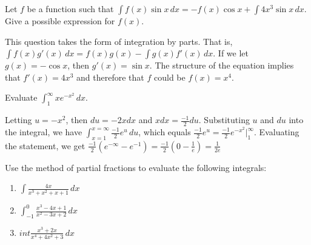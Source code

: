 \begin{Exercise}[label=int_meth3]
Let $f$ be a function such that $\int f(x) \sin{x}\,dx = -f(x)\cos{x} 
+ \int 4x^3 \sin{x}\,dx$. Give a possible expression for $f(x)$. 
\end{Exercise}

\begin{Answer}[ref=int_meth3]
This question takes the form of integration by parts. That is, $\int 
f(x)g'(x)\,dx = f(x)g(x) - \int g(x)f'(x)\,dx$. If we let $g(x) = 
-\cos{x}$, then $g'(x) =\sin{x}$. The structure of the equation 
implies that $f'(x) = 4x^3$ and therefore that $f$ could be $f(x) = 
x^4$. 
\end{Answer}

\begin{Exercise}[label=int_meth4]
Evaluate $\int_1^{\infty}xe^{-x^2}\,dx$. 
\end{Exercise}

\begin{Answer}[ref=int_meth4]
Letting $u = -x^2$, then $du = -2x dx$ and $x dx = \frac{-1}{2}du$. 
Substituting $u$ and $du$ into the integral, we have $\int_{x = 1}^{x 
= \infty} \frac{-1}{2}e^u\,du$, which equals $\frac{-1}{2}e^u = 
\frac{-1}{2}e^{-x^2}|_1^{\infty}$. Evaluating the statement, we get 
$\frac{-1}{2}(e^{-\infty} - e^{-1}) = \frac{-1}{2}(0-\frac{1}{e}) = 
\frac{1}{2e}$
\end{Answer}

\begin{Exercise}[label = partfrac]
Use the method of partial fractions to evaluate the following integrals:
\begin{enumerate}
\item $\int \frac{4x}{x^3 + x^2 + x + 1}\,dx$
\item $\int_{-1}^0 \frac{x^3 - 4x + 1}{x^2 - 3x + 2}\,dx$
\item $int \frac{x^3 + 2x}{x^4 + 4x^2 + 3}\,dx$
\end{enumerate}
\end{Exercise}